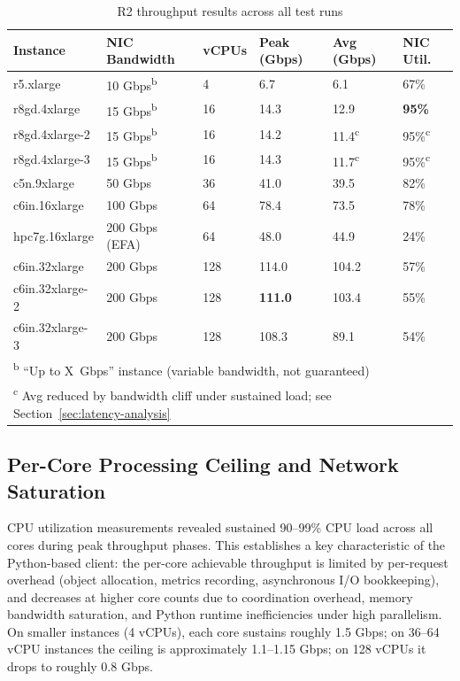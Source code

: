 \begin{table}[H]
\centering
\caption{R2 throughput results across all test runs}
\label{tab:throughput-summary}
\small
\begin{tabular}{p{3cm}p{3cm}p{1.1cm}p{2.1cm}p{2.2cm}p{1.7cm}}
\hline
\textbf{Instance} & \textbf{NIC \newline Bandwidth} & \textbf{vCPUs} & \textbf{Peak (Gbps)} & \textbf{Avg (Gbps)} & \textbf{NIC Util.} \\
\hline
r5.xlarge          & 10 Gbps\textsuperscript{b}  & 4   & 6.7   & 6.1   & 67\% \\
r8gd.4xlarge       & 15 Gbps\textsuperscript{b}  & 16  & 14.3  & 12.9  & \textbf{95\%} \\
r8gd.4xlarge-2     & 15 Gbps\textsuperscript{b}  & 16  & 14.2  & 11.4\textsuperscript{c} & 95\%\textsuperscript{c} \\
r8gd.4xlarge-3     & 15 Gbps\textsuperscript{b}  & 16  & 14.3  & 11.7\textsuperscript{c} & 95\%\textsuperscript{c} \\
c5n.9xlarge        & 50 Gbps  & 36  & 41.0  & 39.5  & 82\% \\
c6in.16xlarge      & 100 Gbps & 64  & 78.4  & 73.5  & 78\% \\
hpc7g.16xlarge     & 200 Gbps (EFA) & 64 & 48.0 & 44.9 & 24\% \\
c6in.32xlarge      & 200 Gbps & 128 & 114.0 & 104.2 & 57\% \\
c6in.32xlarge-2    & 200 Gbps & 128 & \textbf{111.0} & 103.4 & 55\% \\
c6in.32xlarge-3    & 200 Gbps & 128 & 108.3 & 89.1  & 54\% \\
\hline
\multicolumn{6}{l}{\textsuperscript{b} ``Up to X~Gbps'' instance (variable bandwidth, not guaranteed)} \\
\multicolumn{6}{l}{\textsuperscript{c} Avg reduced by bandwidth cliff under sustained load; see Section~\ref{sec:latency-analysis}} \\
\end{tabular}
\end{table}

\subsection{Per-Core Processing Ceiling and Network Saturation}

CPU utilization measurements revealed sustained 90--99\% CPU load across all cores during peak throughput phases. This establishes a key characteristic of the Python-based client: the per-core achievable throughput is limited by per-request overhead (object allocation, metrics recording, asynchronous I/O bookkeeping), and decreases at higher core counts due to coordination overhead, memory bandwidth saturation, and Python runtime inefficiencies under high parallelism. On smaller instances (4 vCPUs), each core sustains roughly 1.5 Gbps; on 36--64 vCPU instances the ceiling is approximately 1.1--1.15 Gbps; on 128 vCPUs it drops to roughly 0.8 Gbps.

